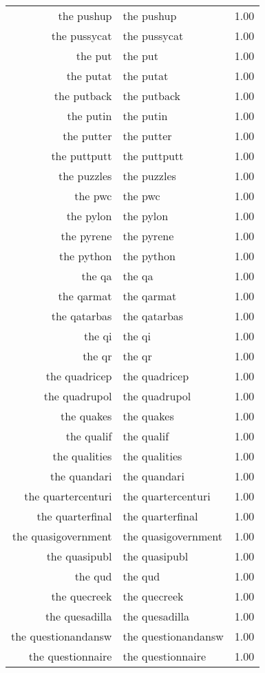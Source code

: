 \begin{table}[ht]
\begin{tabular}{rlr}
  the pushup & the pushup & 1.00 \\ 
  the pussycat & the pussycat & 1.00 \\ 
  the put & the put & 1.00 \\ 
  the putat & the putat & 1.00 \\ 
  the putback & the putback & 1.00 \\ 
  the putin & the putin & 1.00 \\ 
  the putter & the putter & 1.00 \\ 
  the puttputt & the puttputt & 1.00 \\ 
  the puzzles & the puzzles & 1.00 \\ 
  the pwc & the pwc & 1.00 \\ 
  the pylon & the pylon & 1.00 \\ 
  the pyrene & the pyrene & 1.00 \\ 
  the python & the python & 1.00 \\ 
  the qa & the qa & 1.00 \\ 
  the qarmat & the qarmat & 1.00 \\ 
  the qatarbas & the qatarbas & 1.00 \\ 
  the qi & the qi & 1.00 \\ 
  the qr & the qr & 1.00 \\ 
  the quadricep & the quadricep & 1.00 \\ 
  the quadrupol & the quadrupol & 1.00 \\ 
  the quakes & the quakes & 1.00 \\ 
  the qualif & the qualif & 1.00 \\ 
  the qualities & the qualities & 1.00 \\ 
  the quandari & the quandari & 1.00 \\ 
  the quartercenturi & the quartercenturi & 1.00 \\ 
  the quarterfinal & the quarterfinal & 1.00 \\ 
  the quasigovernment & the quasigovernment & 1.00 \\ 
  the quasipubl & the quasipubl & 1.00 \\ 
  the qud & the qud & 1.00 \\ 
  the quecreek & the quecreek & 1.00 \\ 
  the quesadilla & the quesadilla & 1.00 \\ 
  the questionandansw & the questionandansw & 1.00 \\ 
  the questionnaire & the questionnaire & 1.00 \\ 

\end{tabular}
\end{table}
